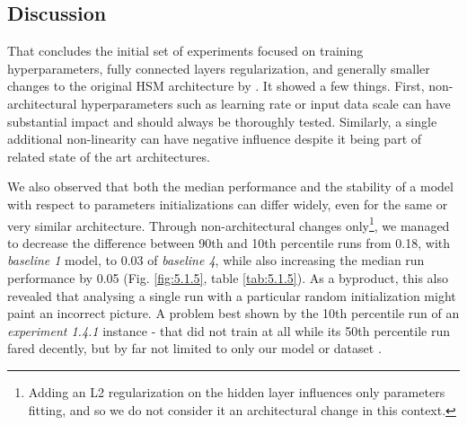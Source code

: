 \subsection{Discussion}
That concludes the initial set of experiments focused on training hyperparameters, fully connected layers regularization, and generally smaller changes to the original HSM architecture by \citeauthor{antolik}. It showed a few things. First, non-architectural hyperparameters such as learning rate or input data scale can have substantial impact and should always be thoroughly tested. Similarly, a single additional non-linearity can have negative influence despite it being part of related state of the art architectures. 

We also observed that both the median performance and the stability of a model with respect to parameters initializations can differ widely, even for the same or very similar architecture. Through non-architectural changes only\footnote{Adding an L2 regularization on the hidden layer influences only parameters fitting, and so we do not consider it an architectural change in this context.}, we managed to decrease the difference between 90th and 10th percentile runs from 0.18, with \textit{baseline 1} model, to 0.03 of \textit{baseline 4}, while also increasing the median run performance by 0.05 (Fig. \ref{fig:5.1.5}, table \ref{tab:5.1.5}). As a byproduct, this also revealed that analysing a single run with a particular random initialization might paint an incorrect picture. A problem best shown by the 10th percentile run of an \textit{experiment 1.4.1} instance - that did not train at all while its 50th percentile run fared decently, but by far not limited to only our model or dataset \citep{2019arXiv190910447M}.


